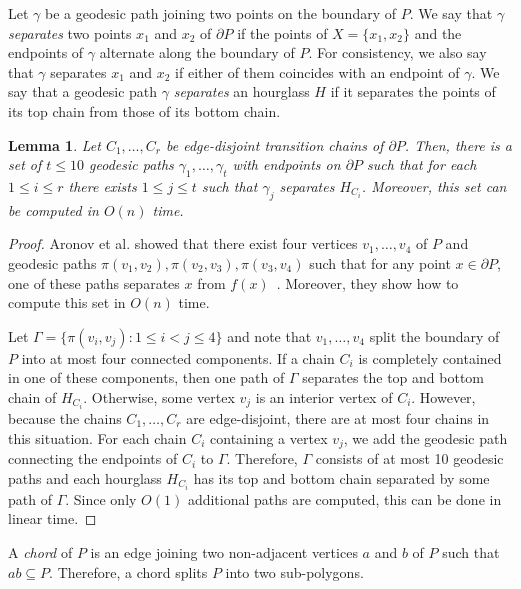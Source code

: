 \documentclass[a4paper]{article}
\newtheorem{lemma}[theorem]{Lemma}
\newcommand{\ff}[1]{\ensuremath{f(#1)}}
\newcommand{\p}[2]{\ensuremath{\pi(#1, #2)}}
\begin{document}
Let $\gamma$ be a  geodesic path joining two points on the boundary of $P$.
We say that $\gamma$ \emph{separates} two points $x_1$ and $x_2$ of $\partial P$ if the points of $X=\{x_1, x_2\}$ and the endpoints of $\gamma$ alternate along the boundary of $P$. 
For consistency, we also say that $\gamma$ separates $x_1$ and $x_2$ if either of them coincides with an endpoint of $\gamma$.
We say that a geodesic path $\gamma$ \emph{separates} an hourglass $H$ if it separates the points of its top chain from those of its  bottom chain.

\begin{lemma}\label{lemma:Split paths}
Let $C_1, \ldots, C_r$ be edge-disjoint transition chains of $\partial P$. Then, there is a set of $t \leq 10$ geodesic paths $\gamma_1, \ldots, \gamma_t$ with endpoints on $\partial P$ such that for each $1\leq i\leq r$ there exists $1\leq j\leq t$ such that $\gamma_j$ separates $H_{C_i}$.
Moreover, this set can be computed in $O(n)$ time.
\end{lemma}
\begin{proof}
Aronov et al. showed that there exist four vertices $v_1, \ldots, v_4$ of $P$ and geodesic paths $\p{v_1}{v_2}, \p{v_2}{v_3}, \p{v_3}{v_4}$ such that for any point $x\in \partial P$, one of these paths separates $x$ from $\ff{x}$~\cite[Lemma 2.7.6]{aronov1993furthest}. Moreover, they show how to compute this set in $O(n)$ time.

Let $\Gamma= \{\p{v_i}{v_j} : 1\leq i < j\leq 4\}$ and note that $v_1, \ldots, v_4$ split the boundary of $P$ into at most four connected components.
If a chain $C_i$ is completely contained in one of these components, then one path of $\Gamma$ separates the top and bottom chain of $H_{C_i}$. Otherwise, some vertex $v_j$ is an interior vertex of $C_i$. However, because the chains $C_1, \ldots, C_r$ are edge-disjoint, there are at most four chains in this situation. 
For each chain $C_i$ containing a vertex $v_j$, we add the geodesic path connecting the endpoints of $C_i$ to $\Gamma$.
Therefore, $\Gamma$ consists of at most 10 geodesic paths and each hourglass $H_{C_i}$ has its top and bottom chain separated by some path of $\Gamma$.
Since only $O(1)$ additional paths are computed, this can be done in linear time.
\end{proof}

A \emph{chord} of $P$ is an edge joining two non-adjacent vertices $a$ and $b$ of $P$ such that $ab\subseteq P$. Therefore, a chord splits $P$ into two sub-polygons.
\end{document}

